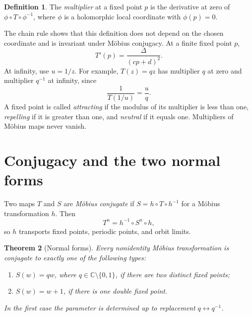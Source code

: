 \documentclass[11pt,a4paper]{article}
\newcommand{\C}{\mathbb{C}}
\theoremstyle{plain}
\newtheorem{theorem}{Theorem}[section]
\theoremstyle{definition}
\newtheorem{definition}[theorem]{Definition}
\theoremstyle{remark}
\begin{document}
\begin{definition}
The \emph{multiplier} at a fixed point $p$ is the derivative at zero of
$\phi\circ T\circ\phi^{-1}$, where $\phi$ is a holomorphic local
coordinate with $\phi(p)=0$.
\end{definition}

The chain rule shows that this definition does not depend on the chosen
coordinate and is invariant under M\"obius conjugacy. At a finite fixed
point $p$,
\begin{equation}\label{eq:derivative}
  T'(p)=\frac{\Delta}{(cp+d)^2}.
\end{equation}
At infinity, use $u=1/z$. For example, $T(z)=qz$ has multiplier $q$ at
zero and multiplier $q^{-1}$ at infinity, since
\[
  \frac{1}{T(1/u)}=\frac{u}{q}.
\]
A fixed point is called \emph{attracting} if the modulus of its multiplier
is less than one, \emph{repelling} if it is greater than one, and
\emph{neutral} if it equals one. Multipliers of M\"obius maps never vanish.

\section{Conjugacy and the two normal forms}

Two maps $T$ and $S$ are \emph{M\"obius conjugate} if
$S=h\circ T\circ h^{-1}$ for a M\"obius transformation $h$. Then
\begin{equation}\label{eq:conjugacy}
  T^n=h^{-1}\circ S^n\circ h,
\end{equation}
so $h$ transports fixed points, periodic points, and orbit limits.

\begin{theorem}[Normal forms]\label{thm:normal}
Every nonidentity M\"obius transformation is conjugate to exactly one of
the following types:
\begin{enumerate}
  \item $S(w)=qw$, where $q\in\C\setminus\{0,1\}$, if there are two
    distinct fixed points;
  \item $S(w)=w+1$, if there is one double fixed point.
\end{enumerate}
In the first case the parameter is determined up to replacement
$q\leftrightarrow q^{-1}$.
\end{theorem}
\end{document}
